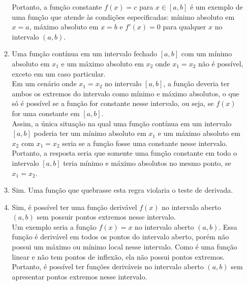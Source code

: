 \documentclass{article}
\begin{document}
\begin{enumerate}
\begin{enumerate}
		            Portanto, a função constante \(f(x) = c\) para \(x \in [a, b]\) é um exemplo de
		            uma função que atende às condições especificadas: mínimo absoluto em \(x = a\),
		            máximo absoluto em \(x = b\) e \(f'(x) = 0\) para qualquer \(x\) no intervalo
		            \((a, b)\). \\

		      \item
		            Uma função contínua em um intervalo fechado \([a, b]\) com um mínimo absoluto
		            em \(x_1\) e um máximo absoluto em \(x_2\) onde \(x_1 = x_2\) não é possível,
		            exceto em um caso particular. \\

		            Em um cenário onde \(x_1 = x_2\) no intervalo \([a, b]\), a função deveria ter
		            ambos os extremos do intervalo como mínimo e máximo absolutos, o que só é
		            possível se a função for constante nesse intervalo, ou seja, se \(f(x)\) for
		            uma constante em \([a, b]\). \\

		            Assim, a única situação na qual uma função contínua em um intervalo \([a, b]\)
		            poderia ter um mínimo absoluto em \(x_1\) e um máximo absoluto em \(x_2\) com
		            \(x_1 = x_2\) seria se a função fosse uma constante nesse intervalo. \\

		            Portanto, a resposta seria que somente uma função constante em todo o intervalo
		            \([a, b]\) teria mínimo e máximo absolutos no mesmo ponto, se \(x_1 = x_2\). \\

		      \item Sim. Uma função que quebrasse esta regra violaria o teste de derivada. \\

		      \item
		            Sim, é possível ter uma função derivável \(f(x)\) no intervalo aberto \((a,
		            b)\) sem possuir pontos extremos nesse intervalo. \\

		            Um exemplo seria a função \(f(x) = x\) no intervalo aberto \((a, b)\). Essa
		            função é derivável em todos os pontos do intervalo aberto, porém não possui um
		            máximo ou mínimo local nesse intervalo. Como é uma função linear e não tem
		            pontos de inflexão, ela não possui pontos extremos. \\

		            Portanto, é possível ter funções deriváveis no intervalo aberto \((a, b)\) sem
		            apresentar pontos extremos nesse intervalo. \\
	      \end{enumerate}
\end{enumerate}
\end{document}
